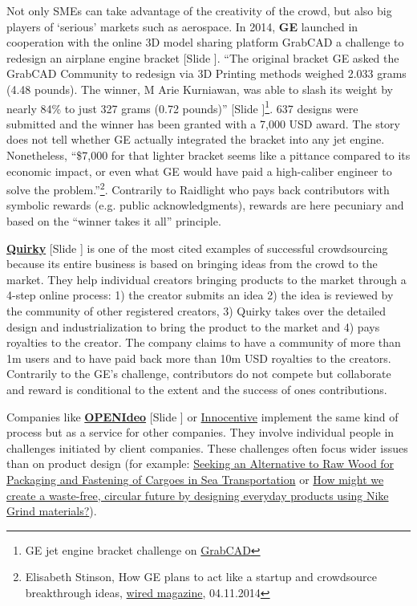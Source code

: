 \documentclass{article}
\newcounter{slide}
\begin{document}
Not only SMEs can take advantage of the creativity of the crowd, but also big players of `serious' markets such as aerospace. In 2014, \textbf{GE} launched in cooperation with the online 3D model sharing platform GrabCAD a challenge to redesign an airplane engine bracket {\color{blue} [Slide ]}. ``The original bracket GE asked the GrabCAD Community to redesign via 3D Printing methods weighed 2.033 grams (4.48 pounds). The winner, M Arie Kurniawan, was able to slash its weight by nearly 84\% to just 327 grams (0.72 pounds)''{\color{blue} [Slide ]}\footnote{GE jet engine bracket challenge on \href{https://grabcad.com/challenges/ge-jet-engine-bracket-challenge}{GrabCAD}}. 637 designs were submitted and the winner has been granted with a 7,000 USD award. The story does not tell whether GE actually integrated the bracket into any jet engine. Nonetheless, ``\$7,000 for that lighter bracket seems like a pittance compared to its economic impact, or even what GE would have paid a high-caliber engineer to solve the problem.''\footnote{Elisabeth Stinson, How GE plans to act like a startup and crowdsource breakthrough ideas, \href{https://www.wired.com/2014/04/how-ge-plans-to-act-like-a-startup-and-crowdsource-great-ideas/}{wired magazine}, 04.11.2014}. Contrarily to Raidlight who pays back contributors with symbolic rewards (e.g. public acknowledgments), rewards are here pecuniary and based on the ``winner takes it all'' principle.

\textbf{\href{https://quirky.com}{Quirky}} {\color{blue}[Slide ]} is one of the most cited examples of successful crowdsourcing because its entire business is based on bringing ideas from the crowd to the market. They help individual creators bringing products to the market through a 4-step online process: 1) the creator submits an idea 2) the idea is reviewed by the community of other registered creators, 3) Quirky takes over the detailed design and industrialization to bring the product to the market and 4) pays royalties to the creator. The company claims to have a community of more than 1m users and to have  paid back more than 10m USD royalties to the creators. Contrarily to the GE's challenge, contributors do not compete but collaborate and reward is conditional to the extent and the success of ones contributions.

Companies like \textbf{\href{https://www.openideo.com/}{OPENIdeo}} {\color{blue}[Slide ]} or \href{https://www.innocentive.com/}{Innocentive} implement the same kind of process but as a service for other companies. They involve individual people in challenges initiated by client companies. These challenges often focus wider issues than on product design (for example: \href{https://www.innocentive.com/ar/challenge/9934083}{Seeking an Alternative to Raw Wood for Packaging and Fastening of Cargoes in Sea Transportation} or \href{https://www.openideo.com/challenge-briefs/nike-design-with-grind}{How might we create a waste-free, circular future by designing everyday products using Nike Grind materials?}).
\end{document}

